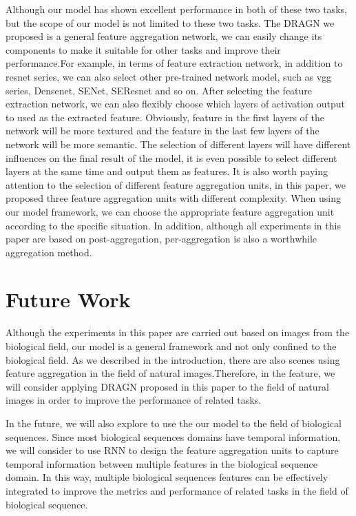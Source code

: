 \documentclass[10pt,twocolumn,letterpaper]{article}
\begin{document}
Although our model has shown excellent performance in both of these two tasks, but the scope of our model is not limited to these two tasks. The DRAGN we proposed is a general feature aggregation network, we can easily change its components to make it suitable for other tasks and improve their performance.For example, in terms of feature extraction network, in addition to resnet series, we can also select other pre-trained network model, such as vgg series, Densenet, SENet, SEResnet and so on. After selecting the feature extraction network, we can also flexibly choose which layers of activation output to used as the extracted feature. Obviously, feature in the first layers of the network will be more textured and the feature in the last few layers of the network will be more semantic. The selection of different layers will have different influences on the final result of the model, it is even possible to select different layers at the same time and output them as features. It is also worth paying attention to the selection of different feature aggregation units, in this paper, we proposed three feature aggregation units with different complexity. When using our model framework, we can choose the appropriate feature aggregation unit according to the specific situation. In addition, although all experiments in this paper are based on post-aggregation, per-aggregation is also a worthwhile aggregation method.

\section{Future Work}
Although the experiments in this paper are carried out based on images from the biological field, our model is a general framework and not only confined to the biological field. As we described in the introduction, there are also scenes using feature aggregation in the field of natural images.Therefore, in the feature, we will consider applying DRAGN proposed in this paper to the field of natural images in order to improve the performance of related tasks.

In the future, we will also explore to use the our model to the field of biological sequences. Since most biological sequences domains have temporal information, we will consider to use RNN to design the feature aggregation units to capture temporal information between multiple features in the biological sequence domain. In this way, multiple biological sequences features can be effectively integrated to improve the metrics and performance of related tasks in the field of biological sequence.

{\small


}
\end{document}

